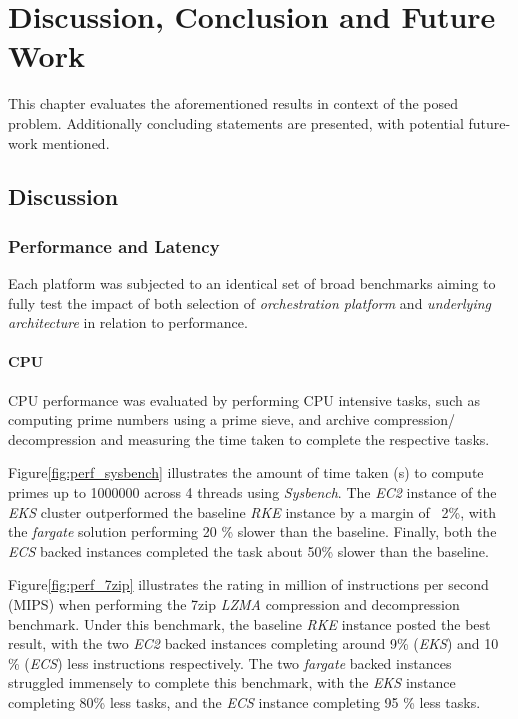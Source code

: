 \part{Discussion, Conclusion and Future Work}
\label{sec:discussion}

This chapter evaluates the aforementioned results in context of the posed problem.
Additionally concluding statements are presented, with potential future-work mentioned.

\chapter{Discussion}

\section{Performance and Latency}
Each platform was subjected to an identical set of broad benchmarks aiming to fully test the impact of both
selection of \emph{orchestration platform} and \emph{underlying architecture} in relation to performance.

\subsection{CPU}
CPU performance was evaluated by performing CPU intensive tasks, such as computing prime numbers using a prime sieve,
and archive compression/ decompression and measuring the time taken to complete the respective tasks.

Figure\ref{fig:perf_sysbench} illustrates the amount of time taken (s) to compute primes up to 1000000 across 4 threads using \textit{Sysbench}.
The \textit{EC2} instance of the \textit{EKS} cluster outperformed the baseline \textit{RKE} instance by a margin of ~2\%,
with the \textit{fargate} solution performing 20 \% slower than the baseline.
Finally, both the \textit{ECS} backed instances completed the task about 50\% slower than the baseline.

Figure\ref{fig:perf_7zip} illustrates the rating in million of instructions per second (MIPS) when performing the 7zip \textit{LZMA} compression and decompression benchmark.
Under this benchmark, the baseline \textit{RKE} instance posted the best result, with the two \textit{EC2} backed instances completing around 9\% (\textit{EKS}) and 10 \% (\textit{ECS}) less instructions respectively.
The two \textit{fargate} backed instances struggled immensely to complete this benchmark,
with the \textit{EKS} instance completing 80\% less tasks, and the \textit{ECS} instance completing 95 \% less tasks.

